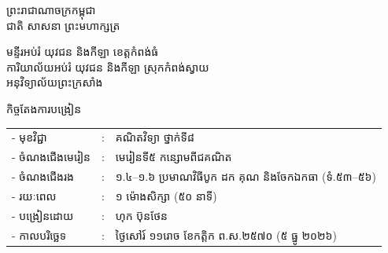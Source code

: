 \documentclass[a4paper,10pt]{article}
\newcommand{\khmflourish}{{\Tacteing\fontsize{36pt}{14pt}\selectfont\raisebox{-5pt}{3}}}
\begin{document}
\fontsize{10pt}{15.2pt}\selectfont

\begin{center}
  {\muol\fontsize{11pt}{16pt}\selectfont ព្រះរាជាណាចក្រកម្ពុជា}\\[2pt]
  {\muol\fontsize{10pt}{15pt}\selectfont ជាតិ សាសនា ព្រះមហាក្សត្រ}\\[1pt]
  \khmflourish
\end{center}

\vspace{-28pt}
{\muol\fontsize{9.5pt}{12.5pt}\selectfont
មន្ទីរអប់រំ យុវជន និងកីឡា ខេត្តកំពង់ធំ\\
ការិយាល័យអប់រំ យុវជន និងកីឡា ស្រុកកំពង់ស្វាយ\\
អនុវិទ្យាល័យព្រះក្រសាំង}

\vspace{1pt}
\begin{center}
  {\muol\fontsize{10pt}{14pt}\selectfont កិច្ចតែងការបង្រៀន}
\end{center}
\vspace{0pt}

{\renewcommand{\arraystretch}{0.95}
\hspace*{4.05cm}%
\begin{tabular}{@{}l l l@{}}
  - \hspace{0.35cm} មុខវិជ្ជា & : & គណិតវិទ្យា ថ្នាក់ទី៨ \\
  - \hspace{0.35cm} ចំណងជើងមេរៀន & : & មេរៀនទី៥ កន្សោមពីជគណិត \\
  - \hspace{0.35cm} ចំណងជើងរង & : & ១.៤--១.៦ ប្រមាណវិធីបូក ដក គុណ និងចែកឯកធា (ទំ.៥៣--៥៦) \\
  - \hspace{0.35cm} រយៈពេល & : & ១ ម៉ោងសិក្សា (៥០ នាទី) \\
  - \hspace{0.35cm} បង្រៀនដោយ & : & ហុក ប៊ុនថែន \\
  - \hspace{0.35cm} កាលបរិច្ឆេទ & : & ថ្ងៃសៅរ៍ ១១រោច ខែកត្តិក ព.ស.២៥៧០ (៥ ធ្នូ ២០២៦) \\
\end{tabular}
}

\vspace{1pt}
\end{document}
